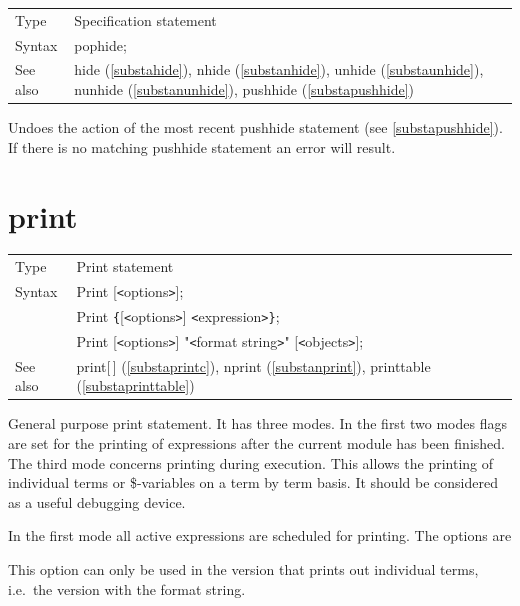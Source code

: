 \noindent \begin{tabular}{ll}
Type & Specification statement\\
Syntax & pophide;
\\ See also & hide (\ref{substahide}),
              nhide (\ref{substanhide}),
              unhide (\ref{substaunhide}),
              nunhide (\ref{substanunhide}),
              pushhide (\ref{substapushhide})
\end{tabular} \vspace{4mm}

\noindent Undoes the action of the most recent 
pushhide statement (see \ref{substapushhide}). If there is 
no matching pushhide statement an error will result. \vspace{10mm}

 
\section{print}
\label{substaprint}

\noindent \begin{tabular}{ll}
Type & Print statement\\
Syntax & Print [{\tt<}options{\tt>}]; \\
       & Print \verb:{:[{\tt<}options{\tt>}] {\tt<}expression{\tt>}\verb:}:; \\
       & Print [{\tt<}options{\tt>}] "{\tt<}format string{\tt>}" [{\tt<}objects{\tt>}];
\\ See also & print[\,] (\ref{substaprintc}),
              nprint (\ref{substanprint}),
              printtable (\ref{substaprinttable})
\end{tabular}\vspace{4mm}

\noindent General purpose print statement. It has three modes. In 
the first two modes flags are set for the printing of expressions after the 
current module has been finished. The third mode concerns printing during 
execution. This allows the printing of individual terms or 
\$-variables on a term by term basis. It should be 
considered as a useful debugging device.

\noindent In the first mode all active expressions are 
scheduled for printing. The options are\vspace{2mm}

 This option can only be used in the 
version that prints out individual terms, i.e.\ the version with the format 
string.

